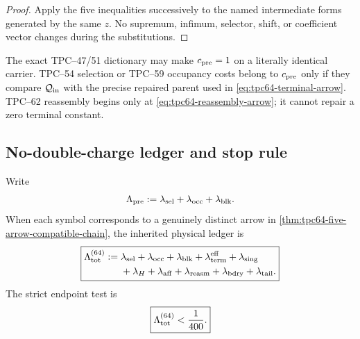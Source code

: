 \begin{proof}
Apply the five inequalities successively to the named intermediate forms
generated by the same \(z\).  No supremum, infimum, selector, shift, or
coefficient vector changes during the substitutions.
\end{proof}

The exact TPC--47/51 dictionary may make
\(c_{\rm pre}=1\) on a literally identical carrier.  TPC--54 selection
or TPC--59 occupancy costs belong to \(c_{\rm pre}\) only if they compare
\(\mathcal Q_{\rm in}\) with the precise repaired parent used in
\eqref{eq:tpc64-terminal-arrow}.  TPC--62 reassembly begins only at
\eqref{eq:tpc64-reassembly-arrow}; it cannot repair a zero terminal
constant.

\subsection{No-double-charge ledger and stop rule}

Write
\begin{equation}
 \Lambda_{\rm pre}
 :=\lambda_{\rm sel}+\lambda_{\rm occ}+\lambda_{\rm blk}.
 \label{eq:tpc64-pre-terminal-ledger}
\end{equation}
When each symbol corresponds to a genuinely distinct arrow in
\cref{thm:tpc64-five-arrow-compatible-chain}, the inherited physical
ledger is
\begin{equation}
 \boxed{
 \begin{aligned}
 \Lambda_{\rm tot}^{(64)}
 :={}&
 \lambda_{\rm sel}+\lambda_{\rm occ}+\lambda_{\rm blk}
 +\lambda_{\rm term}^{\rm eff}
 +\lambda_{\rm sing}\\
 &+\lambda_H+\lambda_{\rm aff}
 +\lambda_{\rm reasm}
 +\lambda_{\rm bdry}+\lambda_{\rm tail}.
 \end{aligned}}
 \label{eq:tpc64-complete-loss-ledger}
\end{equation}
The strict endpoint test is
\begin{equation}
 \boxed{\Lambda_{\rm tot}^{(64)}<\frac1{400}.}
 \label{eq:tpc64-strict-stop-rule}
\end{equation}

